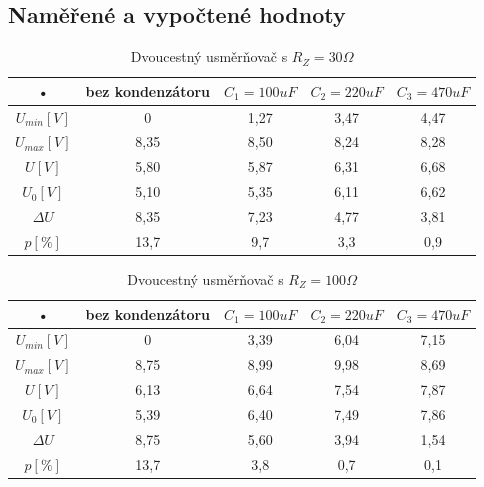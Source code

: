 \documentclass[12pt]{article} %
\begin{document}
\subsection{Naměřené a vypočtené hodnoty}
\begin{table}[H]
\caption{Dvoucestný usměrňovač s $R_Z=30\Omega$}
\begin{tabular}{|c|c|c|c|c|}
\hline 
• & bez kondenzátoru & $C_1 = 100uF$ & $C_2 = 220uF$ & $C_3 = 470uF$ \\ 
\hline 
$U_{min} [V]$ & 0 & 1,27 & 3,47 & 4,47 \\ 
\hline 
$U_{max} [V]$ & 8,35 & 8,50 & 8,24 & 8,28 \\ 
\hline 
$U [V]$ & 5,80 & 5,87 & 6,31 & 6,68 \\ 
\hline 
$U_0 [V]$ & 5,10 & 5,35 & 6,11 & 6,62 \\ 
\hline 
$\Delta U$ & 8,35 & 7,23 & 4,77 & 3,81 \\ 
\hline 
$p [\%]$ & 13,7 & 9,7 & 3,3 & 0,9 \\ 
\hline 
\end{tabular}
\end{table}

\begin{table}[H]
\caption{Dvoucestný usměrňovač s $R_Z=100\Omega$}
\begin{tabular}{|c|c|c|c|c|}
\hline 
• & bez kondenzátoru & $C_1 = 100uF$ & $C_2 = 220uF$ & $C_3 = 470uF$ \\ 
\hline 
$U_{min} [V]$ & 0 & 3,39 & 6,04 & 7,15 \\ 
\hline 
$U_{max} [V]$ & 8,75 & 8,99 & 9,98 & 8,69 \\ 
\hline 
$U [V]$ & 6,13 & 6,64 & 7,54 & 7,87 \\ 
\hline 
$U_0 [V]$ & 5,39 & 6,40 & 7,49 & 7,86 \\ 
\hline 
$\Delta U$ & 8,75 & 5,60 & 3,94 & 1,54 \\ 
\hline 
$p [\%]$ & 13,7 & 3,8 & 0,7 & 0,1 \\ 
\hline 
\end{tabular}
\end{table}
\end{document}

